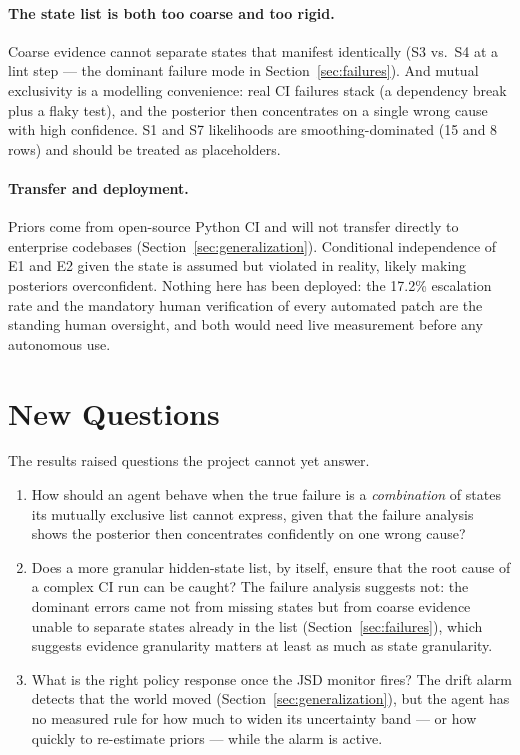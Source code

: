 \documentclass{article}
\begin{document}
\paragraph{The state list is both too coarse and too rigid.} Coarse evidence cannot separate states that manifest identically (S3 vs.\ S4 at a lint step --- the dominant failure mode in Section~\ref{sec:failures}). And mutual exclusivity is a modelling convenience: real CI failures stack (a dependency break plus a flaky test), and the posterior then concentrates on a single wrong cause with high confidence. S1 and S7 likelihoods are smoothing-dominated (15 and 8 rows) and should be treated as placeholders.

\paragraph{Transfer and deployment.} Priors come from open-source Python CI and will not transfer directly to enterprise codebases (Section~\ref{sec:generalization}). Conditional independence of E1 and E2 given the state is assumed but violated in reality, likely making posteriors overconfident. Nothing here has been deployed: the 17.2\% escalation rate and the mandatory human verification of every automated patch are the standing human oversight, and both would need live measurement before any autonomous use.

\section{New Questions}
\label{sec:newquestions}

The results raised questions the project cannot yet answer.

\begin{enumerate}
\item How should an agent behave when the true failure is a \emph{combination} of states its mutually exclusive list cannot express, given that the failure analysis shows the posterior then concentrates confidently on one wrong cause?
\item Does a more granular hidden-state list, by itself, ensure that the root cause of a complex CI run can be caught? The failure analysis suggests not: the dominant errors came not from missing states but from coarse evidence unable to separate states already in the list (Section~\ref{sec:failures}), which suggests evidence granularity matters at least as much as state granularity.
\item What is the right policy response once the JSD monitor fires? The drift alarm detects that the world moved (Section~\ref{sec:generalization}), but the agent has no measured rule for how much to widen its uncertainty band --- or how quickly to re-estimate priors --- while the alarm is active.
\end{enumerate}
\end{document}
